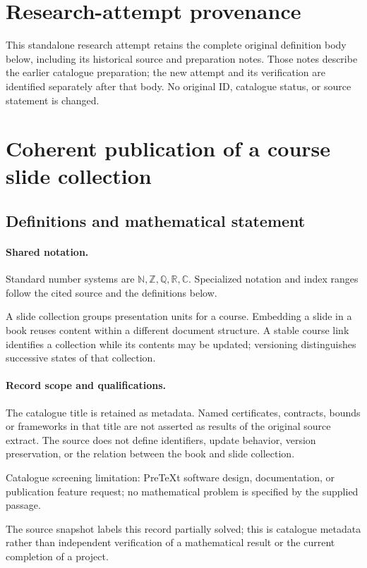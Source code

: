 \documentclass[11pt]{article}
\begin{document}
\section*{Research-attempt provenance}
This standalone research attempt retains the complete original definition body below,
including its historical source and preparation notes. Those notes describe the
earlier catalogue preparation; the new attempt and its verification are identified
separately after that body. No original ID, catalogue status, or source statement is changed.

\section{Coherent publication of a course slide collection}\label{statement}

\subsection{Definitions and mathematical statement}

\paragraph{Shared notation.}Standard number systems are $\mathbb N,\mathbb Z,\mathbb Q,\mathbb R,\mathbb C$. Specialized notation and index ranges follow the cited source and the definitions below.


A slide collection groups presentation units for a course. Embedding a slide in a book reuses content within a different document structure. A stable course link identifies a collection while its contents may be updated; versioning distinguishes successive states of that collection.
\paragraph{Record scope and qualifications.}
The catalogue title is retained as metadata. Named certificates, contracts, bounds or frameworks in that title are not asserted as results of the original source extract.
The source does not define identifiers, update behavior, version preservation, or the relation between the book and slide collection.

Catalogue screening limitation: PreTeXt software design, documentation, or publication feature request; no mathematical problem is specified by the supplied passage.

The source snapshot labels this record partially solved; this is catalogue metadata rather than independent verification of a mathematical result or the current completion of a project.
\end{document}
